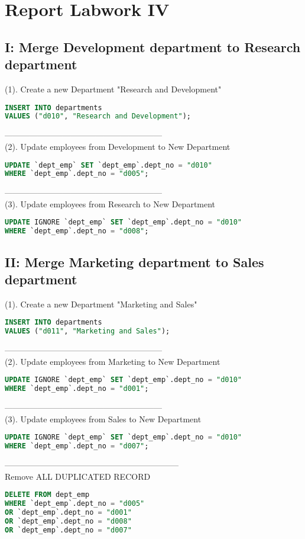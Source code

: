 \documentclass[12pt]{report}
\begin{document}
\section*{Report Labwork IV}

\subsection*{I: Merge Development department to Research department}

(1). Create a new Department "Research and Development"
\begin{lstlisting}[language=sql]
INSERT INTO departments 
VALUES ("d010", "Research and Development");
\end{lstlisting}
---------------------------------------------------------
\\
(2). Update employees from Development to New Department
\begin{lstlisting}[language=sql]
UPDATE `dept_emp` SET `dept_emp`.dept_no = "d010" 
WHERE `dept_emp`.dept_no = "d005";
\end{lstlisting}
---------------------------------------------------------
\\
(3). Update employees from Research to New Department
\begin{lstlisting}[language=sql]
UPDATE IGNORE `dept_emp` SET `dept_emp`.dept_no = "d010" 
WHERE `dept_emp`.dept_no = "d008";
\end{lstlisting}


\subsection*{II: Merge Marketing department to Sales department}

(1). Create a new Department "Marketing and Sales"
\begin{lstlisting}[language=sql]
INSERT INTO departments 
VALUES ("d011", "Marketing and Sales");
\end{lstlisting}
---------------------------------------------------------
\\
(2). Update employees from Marketing to New Department
\begin{lstlisting}[language=sql]
UPDATE IGNORE `dept_emp` SET `dept_emp`.dept_no = "d010" 
WHERE `dept_emp`.dept_no = "d001";
\end{lstlisting}
---------------------------------------------------------
\\
(3). Update employees from Sales to New Department
\begin{lstlisting}[language=sql]
UPDATE IGNORE `dept_emp` SET `dept_emp`.dept_no = "d010" 
WHERE `dept_emp`.dept_no = "d007";
\end{lstlisting}


---------------------------------------------------------------
\\
Remove ALL DUPLICATED RECORD
\begin{lstlisting}[language=sql]
DELETE FROM dept_emp 
WHERE `dept_emp`.dept_no = "d005" 
OR `dept_emp`.dept_no = "d001" 
OR `dept_emp`.dept_no = "d008" 
OR `dept_emp`.dept_no = "d007" 
\end{lstlisting}
\end{document}
